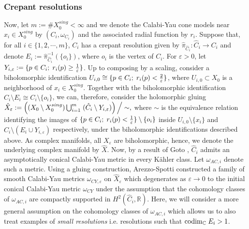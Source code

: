 \documentclass[a4paper,11pt]{article}
\def\C{\mathbb{C}}
\def\R{\mathbb{R}}
\begin{document}
\subsubsection*{Crepant resolutions} 
Now, let $m := \# X_0^{sing} < \infty$ and we denote the Calabi-Yau cone models near $x_i \in X_0^{sing}$ by $(C_i, \omega_{C_i})$ and the associated radial function by $r_i$. Suppose that, for all $i \in \{ 1,2, \cdots, m\}$, $C_i$ has a crepant resolution given by $ \hat \pi_{\hat C_i} : \hat C_i \rightarrow C_i$ and denote $E_i := \hat \pi_{\hat C_i}^{-1}(\{ o_i\})$, where $o_i$ is the vertex of $C_i$. For $\varepsilon >0$, let $Y_{i,\varepsilon} := \{p \in C_i; \hspace{0.1cm} r_i(p) \geq \frac{1}{\varepsilon}  \}$. Up to composing by a scaling, consider a biholomorphic identification $U_{i,0} \cong \{p \in C_i; \hspace{0.1cm} r_i(p)< \frac{2}{\varepsilon} \}$, where $U_{i,0} \subset X_0$ is a neighborhood of $x_i \in X_0^{sing}$. Together with the biholomorphic identification $\hat C_i \setminus E_i \cong C_i \setminus \{ o_i\}$, we can, therefore, consider the holomorphic gluing $\hat X_\varepsilon := \left((X_0 \setminus X_0^{sing}) \bigcup_{i =1}^m \hspace{0.1cm} (\hat C_i \setminus Y_{i,\varepsilon}) \right) \Big/ \sim,$ where $\sim$ is the equivalence relation identifying the images of $\{p \in C_i;\hspace{0.1cm} r_i(p) < \frac{1}{\varepsilon} \} \setminus \{ o_i\}$ inside $U_{i, 0} \setminus \{ x_i\}$ and $\hat C_i \setminus (E_i \cup Y_{i, \varepsilon})$ respectively, under the biholomorphic identifications described above. As complex manifolds, all $X_\varepsilon$ are biholomorphic, hence, we denote the underlying complex manifold by $\hat X$. Now, by a result of Goto \cite{goto_calabi-yau_2012}, $\hat C_i$ admits an asymptotically conical Calabi-Yau metric in every Kähler class. Let $\omega_{AC,i}$ denote such a metric. Using a gluing construction, Arezzo-Spotti \cite{arezzo2016csck} constructed a family of smooth Calabi-Yau metrics $\omega_{CY, \varepsilon}$ on $\hat X_\varepsilon$ which degenerates as $\varepsilon \rightarrow 0$ to the initial conical Calabi-Yau metric $\omega_{CY}$ under the assumption that the cohomology classes of $\omega_{AC,i}$ are compactly supported in $H^2(\hat C_i, \R)$. Here, we will consider a more general assumption on the cohomology classes of $\omega_{AC,i}$ which allows us to also treat examples of \emph{small resolutions} i.e. resolutions such that $\mathrm{codim}_{\C} \hspace{0.1cm} E_i>1$. 
\end{document}
